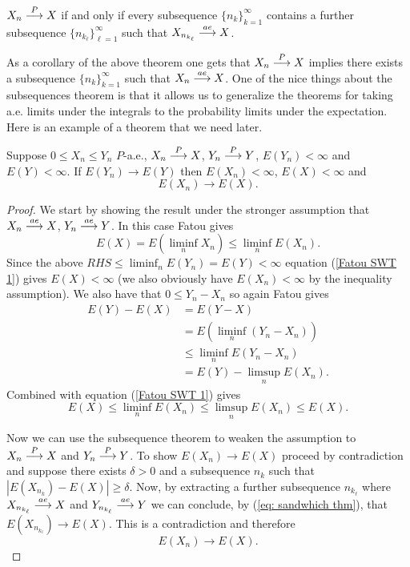 \begin{theorem}
$ X_n\overset{\small P} \longrightarrow X$ if and only if every subsequence $\{ n_k\}_{k=1}^\infty$ contains a further subsequence $\{ n_{k_\ell}\}_{\ell=1}^\infty$ such that $ X_{n_{k_\ell}}\overset{\small ae} \longrightarrow X$.
\end{theorem}


As a corollary of the above theorem one gets that  $ X_n\overset{\small P} \longrightarrow X$ implies there exists a subsequence $\{ n_k\}_{k=1}^\infty$ such that $ X_n\overset{\small ae} \longrightarrow X$. One of the nice things about the subsequences theorem is that it allows us to generalize the theorems for taking a.e. limits under the integrals to the probability limits under the expectation.  Here is an example of a theorem that we need later.

\begin{theorem}
\label{thm: Probability Sandwich Theorem}
Suppose $0 \leq X_n \leq Y_n$ $P$-a.e.,  $X_n\overset{\small P} \longrightarrow X$,  $Y_n\overset{\small P} \longrightarrow Y$, $E(Y_n)<\infty$ and $E(Y)<\infty$. If  $E(Y_n) \rightarrow E(Y)$ then $E(X_n)<\infty$, $E(X)<\infty$ and
\[E(X_n)\rightarrow E(X).\]
\end{theorem}
\begin{proof}

We start by  showing the result under the stronger assumption that $X_n\overset{\small ae} \longrightarrow X$,  $Y_n\overset{\small ae} \longrightarrow Y$. In this case Fatou gives
\begin{equation}
\label{Fatou SWT 1}
E(X) = E(\liminf_n X_n)\leq \liminf_n E(X_n).
\end{equation}
Since the above $ RHS \leq \liminf_n E(Y_n)=E(Y)<\infty$ equation (\ref{Fatou SWT 1}) gives $E(X)<\infty$ (we also obviously have $E(X_n)<\infty$ by the inequality assumption).
We also have that $0\leq Y_n -X_n$ so again Fatou gives
\begin{align*}
E(Y)-E(X) &= E(Y-X) \\
&= E(\liminf_n (Y_n-X_n)) \\
&\leq \liminf_n E(Y_n - X_n) \\
&= E(Y)-\limsup_n E(X_n).
\end{align*}
Combined with equation (\ref{Fatou SWT 1}) gives
\begin{equation}
\label{eq: sandwhich thm}
E(X)\leq \liminf_n E(X_n)\leq \limsup_n E(X_n) \leq E(X).
\end{equation}

Now we can use the subsequence theorem to weaken the assumption to $X_n\overset{\small P} \longrightarrow X$ and  $Y_n\overset{\small P} \longrightarrow Y$.
To show $E(X_n)\rightarrow E(X)$ proceed by contradiction and suppose there exists $\delta>0$ and a subsequence $n_k$ such that $|E(X_{n_k})- E(X)|\geq \delta$. Now, by extracting a further subsequence $n_{k_\ell}$ where $X_{n_{k_\ell}}\overset{\small ae} \longrightarrow X$ and $Y_{n_{k_\ell}}\overset{\small ae} \longrightarrow Y$ we can conclude, by (\ref{eq: sandwhich thm}), that $E(X_{n_{k_\ell}})\rightarrow E(X).$ This is a contradiction and therefore
\[
E(X_n)\rightarrow E(X).
\]
\end{proof}


